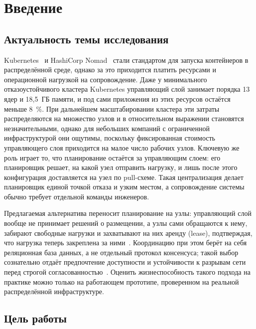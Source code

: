 \documentclass[oneside,final,14pt,a4paper]{extreport}
\begin{document}


\tableofcontents
\newpage

\chapter*{Введение}

\section*{Актуальность темы исследования}

Kubernetes~\cite{k8s_docs} и HashiCorp Nomad~\cite{nomad_docs} стали стандартом
для запуска контейнеров в распределённой среде, однако за это приходится платить
ресурсами и операционной нагрузкой на сопровождение. Даже у минимального
отказоустойчивого кластера Kubernetes управляющий слой занимает порядка 13 ядер и
18{,}5~ГБ памяти, и под сами приложения из этих ресурсов остаётся меньше 8~\%. При
дальнейшем масштабировании кластера эти затраты распределяются на множество узлов
и в относительном выражении становятся незначительными, однако для небольших
компаний с ограниченной инфраструктурой они ощутимы, поскольку фиксированная
стоимость управляющего слоя приходится на малое число рабочих узлов. Ключевую же
роль играет то, что планирование остаётся за управляющим слоем: его
планировщик решает, на какой узел отправить нагрузку, и лишь после этого
конфигурация доставляется на узел по pull-схеме. Такая централизация делает
планировщик единой точкой отказа и узким местом, а сопровождение системы обычно
требует отдельной команды инженеров.

Предлагаемая альтернатива переносит планирование на узлы: управляющий слой вообще
не принимает решений о размещении, а узлы сами обращаются к нему, забирают
свободные нагрузки и захватывают на них аренду (lease), подтверждая, что нагрузка
теперь закреплена за ними~\cite{hiku2025pull, gray1989leases}.
Координацию при этом берёт на себя реляционная база данных, а не отдельный
протокол консенсуса; такой выбор сознательно отдаёт предпочтение доступности и
устойчивости к разрывам сети перед строгой
согласованностью~\cite{brewer2012cap, decandia2007dynamo}. Оценить
жизнеспособность такого подхода на практике можно только на работающем прототипе,
проверенном на реальной распределённой инфраструктуре.

\section*{Цель работы}
\end{document}
